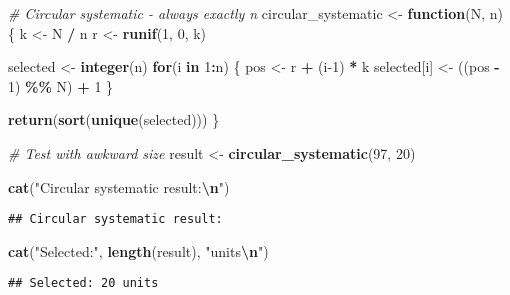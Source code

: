 \documentclass[
]{article}
\newenvironment{Shaded}{\begin{snugshade}}{\end{snugshade}}
\newcommand{\CommentTok}[1]{\textcolor[rgb]{0.56,0.35,0.01}{\textit{#1}}}
\newcommand{\ControlFlowTok}[1]{\textcolor[rgb]{0.13,0.29,0.53}{\textbf{#1}}}
\newcommand{\DecValTok}[1]{\textcolor[rgb]{0.00,0.00,0.81}{#1}}
\newcommand{\FunctionTok}[1]{\textcolor[rgb]{0.13,0.29,0.53}{\textbf{#1}}}
\newcommand{\NormalTok}[1]{#1}
\newcommand{\OtherTok}[1]{\textcolor[rgb]{0.56,0.35,0.01}{#1}}
\newcommand{\SpecialCharTok}[1]{\textcolor[rgb]{0.81,0.36,0.00}{\textbf{#1}}}
\newcommand{\StringTok}[1]{\textcolor[rgb]{0.31,0.60,0.02}{#1}}
\begin{document}
\begin{Shaded}
\begin{Highlighting}[]
\CommentTok{\# Circular systematic {-} always exactly n}
\NormalTok{circular\_systematic }\OtherTok{\textless{}{-}} \ControlFlowTok{function}\NormalTok{(N, n) \{}
\NormalTok{  k }\OtherTok{\textless{}{-}}\NormalTok{ N }\SpecialCharTok{/}\NormalTok{ n}
\NormalTok{  r }\OtherTok{\textless{}{-}} \FunctionTok{runif}\NormalTok{(}\DecValTok{1}\NormalTok{, }\DecValTok{0}\NormalTok{, k)}
  
\NormalTok{  selected }\OtherTok{\textless{}{-}} \FunctionTok{integer}\NormalTok{(n)}
  \ControlFlowTok{for}\NormalTok{(i }\ControlFlowTok{in} \DecValTok{1}\SpecialCharTok{:}\NormalTok{n) \{}
\NormalTok{    pos }\OtherTok{\textless{}{-}}\NormalTok{ r }\SpecialCharTok{+}\NormalTok{ (i}\DecValTok{{-}1}\NormalTok{) }\SpecialCharTok{*}\NormalTok{ k}
\NormalTok{    selected[i] }\OtherTok{\textless{}{-}}\NormalTok{ ((pos }\SpecialCharTok{{-}} \DecValTok{1}\NormalTok{) }\SpecialCharTok{\%\%}\NormalTok{ N) }\SpecialCharTok{+} \DecValTok{1}
\NormalTok{  \}}
  
  \FunctionTok{return}\NormalTok{(}\FunctionTok{sort}\NormalTok{(}\FunctionTok{unique}\NormalTok{(selected)))}
\NormalTok{\}}

\CommentTok{\# Test with awkward size}
\NormalTok{result }\OtherTok{\textless{}{-}} \FunctionTok{circular\_systematic}\NormalTok{(}\DecValTok{97}\NormalTok{, }\DecValTok{20}\NormalTok{)}

\FunctionTok{cat}\NormalTok{(}\StringTok{"Circular systematic result:}\SpecialCharTok{\textbackslash{}n}\StringTok{"}\NormalTok{)}
\end{Highlighting}
\end{Shaded}

\begin{verbatim}
## Circular systematic result:
\end{verbatim}

\begin{Shaded}
\begin{Highlighting}[]
\FunctionTok{cat}\NormalTok{(}\StringTok{"Selected:"}\NormalTok{, }\FunctionTok{length}\NormalTok{(result), }\StringTok{"units}\SpecialCharTok{\textbackslash{}n}\StringTok{"}\NormalTok{)}
\end{Highlighting}
\end{Shaded}

\begin{verbatim}
## Selected: 20 units
\end{verbatim}
\end{document}
